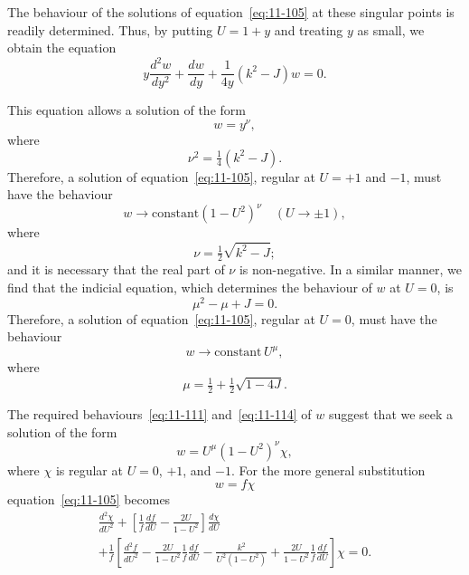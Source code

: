 The behaviour of the solutions of equation~\eqref{eq:11-105} at these singular points is readily determined. Thus, by putting $U = 1+y$ and treating $y$ as small, we obtain the equation
\begin{equation}
\label{eq:11-108}
y\frac{d^2w}{dy^2}+\frac{dw}{dy}+\frac{1}{4y}(k^2-J)w = 0.
\end{equation}

This equation allows a solution of the form
\begin{equation}
\label{eq:11-109}
w = y^{\nu},
\end{equation}
where
\begin{equation}
\label{eq:11-110}
\nu^2 = \tfrac{1}{4}(k^2-J).
\end{equation}
Therefore, a solution of equation~\eqref{eq:11-105}, regular at $U = +1$ and $-1$, must have the behaviour
\begin{equation}
\label{eq:11-111}
w \to \text{constant}(1-U^2)^{\nu} \quad (U \to \pm 1),
\end{equation}
where
\begin{equation}
\label{eq:11-112}
\nu = \tfrac{1}{2}\sqrt{k^2-J};
\end{equation}
and it is necessary that the real part of $\nu$ is non-negative. In a similar manner, we find that the indicial equation, which determines the behaviour of $w$ at $U = 0$, is
\begin{equation}
\label{eq:11-113}
\mu^2-\mu+J = 0.
\end{equation}
Therefore, a solution of equation~\eqref{eq:11-105}, regular at $U = 0$, must have the behaviour
\begin{equation}
\label{eq:11-114}
w \to \text{constant}\,U^{\mu},
\end{equation}
where
\begin{equation}
\label{eq:11-115}
\mu = \tfrac{1}{2}+\tfrac{1}{2}\sqrt{1-4J}.
\end{equation}

The required behaviours~\eqref{eq:11-111} and~\eqref{eq:11-114} of $w$ suggest that we seek a solution of the form
\begin{equation}
\label{eq:11-116}
w = U^{\mu}(1-U^2)^{\nu}\chi,
\end{equation}
where $\chi$ is regular at $U = 0$, $+1$, and $-1$. For the more general substitution
\begin{equation}
\label{eq:11-117}
w = f\chi
\end{equation}
equation~\eqref{eq:11-105} becomes
\begin{multline}
\label{eq:11-118}
\frac{d^2\chi}{dU^2}+\left[\frac{1}{f}\frac{df}{dU}-\frac{2U}{1-U^2}\right]\frac{d\chi}{dU} \\
+\frac{1}{f}\!\left[\frac{d^2f}{dU^2}-\frac{2U}{1-U^2}\frac{1}{f}\frac{df}{dU}-\frac{k^2}{U^2(1-U^2)}+\frac{2U}{1-U^2}\frac{1}{f}\frac{df}{dU}\right]\chi = 0.
\end{multline}

